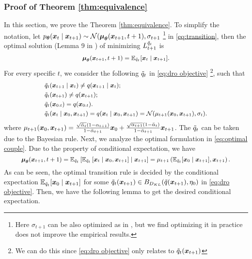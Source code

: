 \subsubsection{Proof of Theorem \ref{thm:equivalence}}\label{app:proof of equivalence}

In this section, we prove the Theorem \ref{thm:equivalence}. To simplify the notation, let  $p_{\boldsymbol{\theta}}(\boldsymbol{x}_{t} \mid \boldsymbol{x}_{t + 1})\sim \mathcal{N}(\text{\boldmath{$\mu$}}_{\boldsymbol{\theta}}(\boldsymbol{x}_{t + 1}, t + 1), \sigma_{t + 1}$ \footnote{Here $\sigma_{t + 1}$ can be also optimized as in \citep{bao2022analytic}, but we find optimizing it in practice does not improve the empirical results.} in \eqref{eq:transition}, then the optimal solution (Lemma 9 in \citep{bao2022analytic}) of minimizing $L^{\tilde{q}_{t}}_{t + 1}$ is 
	\begin{equation}\label{eq:optimal couple}
		\small
		\begin{aligned}
			\text{\boldmath{$\mu$}}_{\boldsymbol{\theta}}(\boldsymbol{x}_{t + 1}, t + 1) = \mathbb{E}_{\tilde{q}_{t}}[\boldsymbol{x}_{t}\mid \boldsymbol{x}_{t + 1}].
		\end{aligned}
	\end{equation} 
	For every specific $t$, we consider the following $\tilde{q}_{t}$ in \eqref{eq:dro objective} \footnote{We can do this since \eqref{eq:dro objective} only relates to $\tilde{q}_{t}(\boldsymbol{x}_{t + 1})$}, such that 
	\begin{equation}\label{eq:formulation of qt}
		\small
		\begin{aligned}
			& \tilde{q}_{t}(\boldsymbol{x}_{t + 1} \mid \boldsymbol{x}_{t}) \neq q(\boldsymbol{x}_{t + 1} \mid \boldsymbol{x}_{t}); \\
            & \tilde{q}_{t}(\boldsymbol{x}_{t + 1}) \neq q(\boldsymbol{x}_{t + 1}); \\
			& \tilde{q}_{t}(\boldsymbol{x}_{0:t}) = q(\boldsymbol{x}_{0:t}). \\
			& \tilde{q}_{t}(\boldsymbol{x}_{t}\mid \boldsymbol{x}_{0}, \boldsymbol{x}_{t + 1}) = q(\boldsymbol{x}_{t}\mid \boldsymbol{x}_{0}, \boldsymbol{x}_{t + 1}) = \mathcal{N}(\mu_{t + 1}(\boldsymbol{x}_{0}, \boldsymbol{x}_{t + 1}), \sigma_{t}). 
		\end{aligned}
	\end{equation}
    where $\mu_{t + 1}(\boldsymbol{x}_{0}, \boldsymbol{x}_{t + 1}) = \frac{\sqrt{\bar{\alpha}_{t}}(1 - \alpha_{t+1})}{1 - \bar{\alpha}_{t + 1}}\boldsymbol{x}_{0} + \frac{\sqrt{\alpha_{t + 1}}(1 - \bar{\alpha}_{t})}{1 - \bar{\alpha}_{t + 1}}\boldsymbol{x}_{t + 1}$. The $\tilde{q}_{t}$ can be taken due to the Bayesian rule. Next, we analyze the optimal formulation in \eqref{eq:optimal couple}. Due to the property of conditional expectation, we have 
	\begin{equation}
		\small
		\text{\boldmath{$\mu$}}_{\boldsymbol{\theta}}(\boldsymbol{x}_{t + 1}, t + 1) = \mathbb{E}_{\tilde{q}_{t}}\left[\mathbb{E}_{\tilde{q}_{t}}\left[\boldsymbol{x}_{t} \mid \boldsymbol{x}_{0}, \boldsymbol{x}_{t + 1}\right]\mid \boldsymbol{x}_{t+1}\right] = \mu_{t + 1}\left(\mathbb{E}_{\tilde{q}_{t}}[\boldsymbol{x}_{0}\mid \boldsymbol{x}_{t + 1}], \boldsymbol{x}_{t + 1}\right).
	\end{equation}
As can be seen, the optimal transition rule is decided by the conditional expectation $\mathbb{E}_{\tilde{q}_{t}}[\boldsymbol{x}_{0}\mid \boldsymbol{x}_{t + 1}]$ for some $\tilde{q}_{t}(\boldsymbol{x}_{t + 1})\in B_{D_{KL}}(\tilde{q}(\boldsymbol{x}_{t + 1}), \eta_{0})$ in \eqref{eq:dro objective}. Then, we have the following lemma to get the desired conditional expectation.

